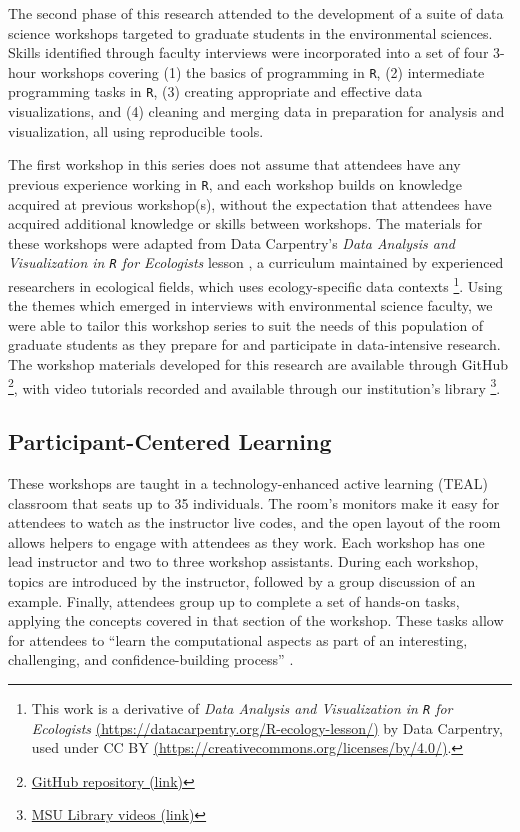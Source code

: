 \documentclass[12pt]{article}
\begin{document}
\quad The second phase of this research attended to the  development of a suite
of data science workshops targeted to graduate students in the environmental
sciences. Skills identified through faculty interviews were incorporated into a
set of four 3-hour workshops covering (1) the basics of programming in 
\texttt{R}, (2) intermediate programming tasks in \texttt{R}, (3) creating
appropriate and effective data visualizations, and (4) cleaning and merging data
in preparation for analysis and visualization, all using reproducible tools. 

\quad The first workshop in this series does not assume that attendees have any
previous experience working in \texttt{R}, and each workshop builds on knowledge
acquired at previous workshop(s), without the expectation that attendees have
acquired additional knowledge or skills between workshops. The materials for 
these workshops were adapted from Data Carpentry's \emph{Data Analysis and
Visualization in \texttt{R} for Ecologists} lesson \citep{ecology_curriculum}, a
curriculum maintained by experienced researchers in ecological fields, which 
uses ecology-specific data contexts \footnote{This work is a derivative of 
\emph{Data Analysis and Visualization in \texttt{R} for Ecologists} 
\href{https://datacarpentry.org/R-ecology-lesson/}{(https://datacarpentry.org/R-ecology-lesson/)}
by Data Carpentry, used under CC BY 
\href{https://creativecommons.org/licenses/by/4.0/}{(https://creativecommons.org/licenses/by/4.0/)}.}. 
Using the themes which emerged in interviews with environmental science faculty,
we were able to tailor this workshop series to suit the needs of this population
of graduate students as they prepare for and participate in data-intensive
research. The workshop materials developed for this research are available
through GitHub
\footnote{\href{https://github.com/atheobold/data-science-workshops-jse}{GitHub
repository (link)}}, with video tutorials recorded and available through our
institution's library 
\footnote{\href{http://bit.ly/ws_recordings}{MSU Library videos (link)}}.  


\subsection{Participant-Centered Learning}  

\quad These workshops are taught in a technology-enhanced active learning (TEAL)
classroom that seats up to 35 individuals. The room's monitors make it easy for 
attendees to watch as the instructor live codes, and the open layout of the room
allows helpers to engage with attendees as they work. Each workshop has one lead
instructor and two to three workshop assistants. During each workshop, topics
are introduced by the instructor, followed by a group discussion of an example. 
Finally, attendees group up to complete a set of hands-on tasks, applying the
concepts covered in that section of the workshop. These tasks allow for
attendees to ``learn the computational aspects as part of an interesting, 
challenging, and confidence-building process'' \citep[p. 101]{nolan}.
\end{document}
